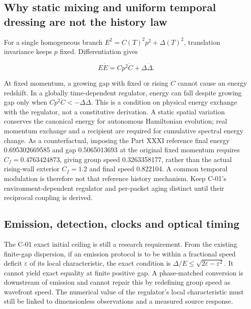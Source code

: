 \documentclass[
  11pt,
  twoside]{article}
\begin{document}
\subsection{Why static mixing and uniform temporal dressing are not the
history
law}\label{why-static-mixing-and-uniform-temporal-dressing-are-not-the-history-law}

For a single homogeneous branch \(E^2=C(T)^2p^2+\Delta(T)^2\),
translation invariance keeps \(p\) fixed. Differentiation gives

\[E\dot E=Cp^2\dot C+\Delta\dot\Delta.\tag{K14}\]

At fixed momentum, a growing gap with fixed or rising \(C\) cannot cause
an energy redshift. In a globally time-dependent regulator, energy can
fall despite growing gap only when \(Cp^2\dot C<-\Delta\dot\Delta\).
This is a condition on physical energy exchange with the regulator, not
a constitutive derivation. A static spatial variation conserves the
canonical energy for autonomous Hamiltonian evolution; real momentum
exchange and a recipient are required for cumulative spectral energy
change. As a counterfactual, imposing the Part XXXI reference final
energy 0.695302669585 and gap 0.5065013693 at the original fixed
momentum requires \(C_f=0.4763424873\), giving group speed 0.3263358177,
rather than the actual rising-wall exterior \(C_f=1.2\) and final speed
0.822104. A common temporal modulation is therefore not that reference
history mechanism. Keep C-01's environment-dependent regulator and
per-packet aging distinct until their reciprocal coupling is derived.

\subsection{Emission, detection, clocks and optical
timing}\label{emission-detection-clocks-and-optical-timing}

The C-01 exact initial ceiling is still a research requirement. From the
existing finite-gap dispersion, if an emission protocol is to be within
a fractional speed deficit \(\varepsilon\) of its local characteristic,
the exact condition is
\(\Delta/E\leq\sqrt{2\varepsilon-\varepsilon^2}\). It cannot yield exact
equality at finite positive gap. A phase-matched conversion is
downstream of emission and cannot repair this by redefining group speed
as wavefront speed. The numerical value of the regulator's local
characteristic must still be linked to dimensionless observations and a
measured source response.
\end{document}
